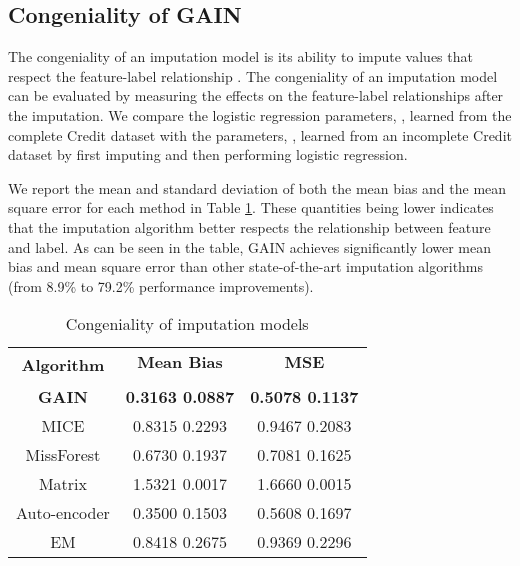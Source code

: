 \documentclass{article}
\begin{document}
\subsection{Congeniality of GAIN}



The congeniality of an imputation model is its ability to impute values that respect the feature-label relationship \cite{congeniality_meng, reason_of_imputation1, reason_of_imputation2}. The congeniality of an imputation model can be evaluated by measuring the effects on the feature-label relationships after the imputation. We compare the logistic regression parameters, , learned from the complete Credit dataset with the parameters, , learned from an incomplete Credit dataset by first imputing and then performing logistic regression.

We report the mean and standard deviation of both the mean bias  and the mean square error  for each method in Table \ref{tab:congeniality}. These quantities being lower indicates that the imputation algorithm better respects the relationship between feature and label. As can be seen in the table, GAIN achieves significantly lower mean bias and mean square error than other state-of-the-art imputation algorithms (from 8.9\% to 79.2\% performance improvements).

\begin{table}[t!]
	\renewcommand{\arraystretch}{1.3}
	\caption{Congeniality of imputation models}
	\label{tab:congeniality}
	\centering
	\begin{tabular}{|c|c|c|}
		\toprule
		\multirow{2}{*}{\textbf{Algorithm}} & \textbf{Mean Bias} & \textbf{MSE} \\
		&  & \\
		\midrule
		\textbf{GAIN} & \textbf{0.3163 0.0887} & \textbf{0.5078 0.1137} \\ \midrule
		MICE   & 0.8315  0.2293 & 0.9467  0.2083 \\
		MissForest & 0.6730  0.1937 & 0.7081  0.1625 \\
		Matrix & 1.5321  0.0017 & 1.6660  0.0015 \\
		Auto-encoder & 0.3500  0.1503 & 0.5608 0.1697  \\
		EM  & 0.8418  0.2675 & 0.9369  0.2296 \\
		\bottomrule
	\end{tabular}
\end{table}
\end{document}
